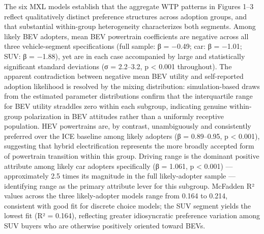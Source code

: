 \documentclass[
  letterpaper,
  DIV=11,
  numbers=noendperiod]{scrartcl}
\begin{document}
The six MXL models establish that the aggregate WTP patterns in Figures
1--3 reflect qualitatively distinct preference structures across
adoption groups, and that substantial within-group heterogeneity
characterizes both segments. Among likely BEV adopters, mean BEV
powertrain coefficients are negative across all three vehicle-segment
specifications (full sample: β = −0.49; car: β = −1.01; SUV: β = −1.88),
yet are in each case accompanied by large and statistically significant
standard deviations (\textbar σ\textbar{} = 2.2--3.2, p \textless{}
0.001 throughout). The apparent contradiction between negative mean BEV
utility and self-reported adoption likelihood is resolved by the mixing
distribution: simulation-based draws from the estimated parameter
distributions confirm that the interquartile range for BEV utility
straddles zero within each subgroup, indicating genuine within-group
polarization in BEV attitudes rather than a uniformly receptive
population. HEV powertrains are, by contrast, unambiguously and
consistently preferred over the ICE baseline among likely adopters (β =
0.89--0.95, p \textless{} 0.001), suggesting that hybrid electrification
represents the more broadly accepted form of powertrain transition
within this group. Driving range is the dominant positive attribute
among likely car adopters specifically (β = 1.061, p \textless{} 0.001)
--- approximately 2.5 times its magnitude in the full likely-adopter
sample --- identifying range as the primary attribute lever for this
subgroup. McFadden R² values across the three likely-adopter models
range from 0.164 to 0.214, consistent with good fit for discrete choice
models; the SUV segment yields the lowest fit (R² = 0.164), reflecting
greater idiosyncratic preference variation among SUV buyers who are
otherwise positively oriented toward BEVs.
\end{document}
